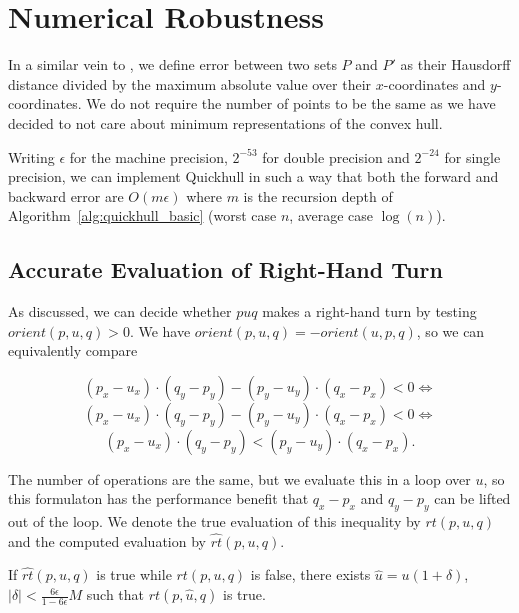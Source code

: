 \section{Numerical Robustness}

In a similar vein to \cite{Jiang06}, we define error between two sets
$P$ and $P'$ as their Hausdorff distance divided by the maximum absolute
value over their $x$-coordinates and $y$-coordinates. We do not require
the number of points to be the same as we have decided to not care about
minimum representations of the convex hull.

Writing $\epsilon$ for the machine precision, $2^{-53}$ for double precision
and $2^{-24}$ for single precision, we can implement Quickhull in such a way
that both the forward and backward error are $O(m \epsilon)$ where $m$ is
the recursion depth of Algorithm~\ref{alg:quickhull_basic} (worst case $n$,
average case $\log(n)$).

\subsection{Accurate Evaluation of Right-Hand Turn}

As discussed, we can decide whether $puq$ makes a right-hand turn by testing
$orient(p, u, q) > 0$. We have $orient(p, u, q) = -orient(u, p, q)$, so
we can equivalently compare

$$(p_x - u_x) \cdot (q_y - p_y) - (p_y - u_y) \cdot (q_x - p_x) < 0 \iff$$
$$(p_x - u_x) \cdot (q_y - p_y) - (p_y - u_y) \cdot (q_x - p_x) < 0 \iff$$
$$(p_x - u_x) \cdot (q_y - p_y) < (p_y - u_y) \cdot (q_x - p_x).$$

The number of operations are the same, but we evaluate this in a loop over $u$, 
so this formulaton has the performance benefit that $q_x - p_x$ and $q_y - p_y$ 
can be lifted out of the loop. We denote the true evaluation of this inequality
by $rt(p, u, q)$ and the computed evaluation by $\widehat{rt}(p, u, q)$.


\begin{lemma}\label{lem:right-turn}
    If $\widehat{rt}(p, u, q)$ is true while $rt(p, u, q)$ is false, there exists
    $\hat{u} = u(1 + \delta)$, $|\delta| < \frac{6\epsilon}{1 - 6\epsilon}M$ 
    such that $rt(p, \hat{u}, q)$ is true.
\end{lemma}


